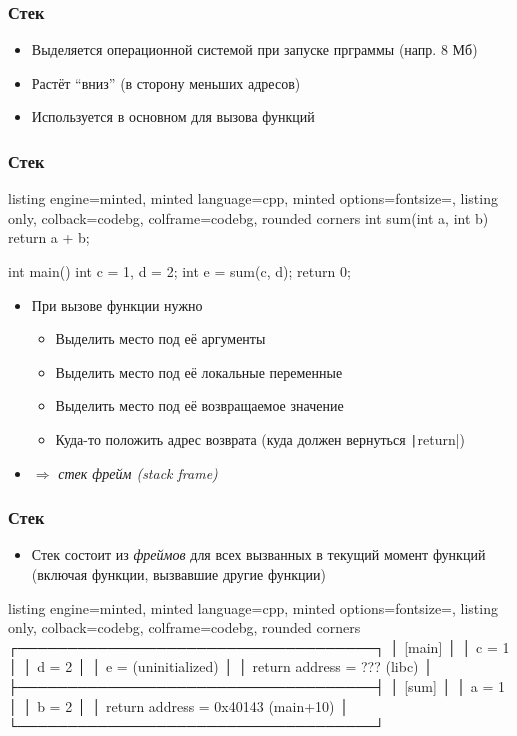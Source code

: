 \documentclass[10pt]{beamer}
\begin{document}
\begin{frame}[fragile]
\frametitle{Стек}
\begin{itemize}
\item Выделяется операционной системой при запуске прграммы (напр. 8 Мб)
\pause
\item Растёт ``вниз'' (в сторону меньших адресов)
\pause
\item Используется в основном для вызова функций
\end{itemize}
\end{frame}

\begin{frame}[fragile]
\frametitle{Стек}
\begin{tcblisting}{listing engine=minted, minted language=cpp, minted options={fontsize=\scriptsize}, listing only, colback=codebg, colframe=codebg, rounded corners}
int sum(int a, int b) {
  return a + b;
}

int main() {
  int c = 1, d = 2;
  int e = sum(c, d);
  return 0;
}
\end{tcblisting}
\pause
{}
\begin{itemize}
\item При вызове функции нужно
\begin{itemize}
\item Выделить место под её аргументы
\item Выделить место под её локальные переменные
\item Выделить место под её возвращаемое значение
\item Куда-то положить адрес возврата (куда должен вернуться \texttt|return|)
\end{itemize}
\pause
\item \(\Longrightarrow\) \textit{стек фрейм (stack frame)}
\end{itemize}
\end{frame}

\begin{frame}[fragile]
\frametitle{Стек}
\begin{itemize}
\item Стек состоит из \textit{фреймов} для всех вызванных в текущий момент функций (включая функции, вызвавшие другие функции)
\end{itemize}
\begin{tcblisting}{listing engine=minted, minted language=cpp, minted options={fontsize=\scriptsize}, listing only, colback=codebg, colframe=codebg, rounded corners}
┌────────────────────────────────────┐
│                [main]              │
│ c = 1                              │
│ d = 2                              │
│ e = (uninitialized)                │
│ return address = ??? (libc)        │
├────────────────────────────────────┤
│                [sum]               │
│ a = 1                              │
│ b = 2                              │
│ return address = 0x40143 (main+10) │
└────────────────────────────────────┘
\end{tcblisting}
\end{frame}
\end{document}
